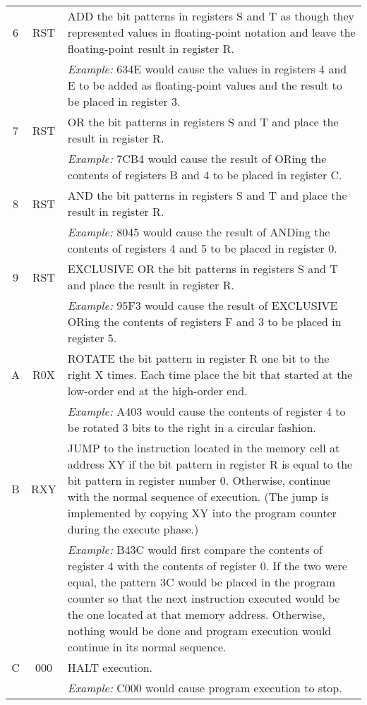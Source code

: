 \begin{longtable}{|c|c|p{10cm}|}
\hline
6 & RST & ADD the bit patterns in registers S and T as though they represented values in floating-point notation and leave the floating-point result in register R. \\
  &     & \textit{Example:} 634E would cause the values in registers 4 and E to be added as floating-point values and the result to be placed in register 3. \\
\hline
7 & RST & OR the bit patterns in registers S and T and place the result in register R. \\
  &     & \textit{Example:} 7CB4 would cause the result of ORing the contents of registers B and 4 to be placed in register C. \\
\hline
8 & RST & AND the bit patterns in registers S and T and place the result in register R. \\
  &     & \textit{Example:} 8045 would cause the result of ANDing the contents of registers 4 and 5 to be placed in register 0. \\
\hline
9 & RST & EXCLUSIVE OR the bit patterns in registers S and T and place the result in register R. \\
  &     & \textit{Example:} 95F3 would cause the result of EXCLUSIVE ORing the contents of registers F and 3 to be placed in register 5. \\
\hline
A & R0X & ROTATE the bit pattern in register R one bit to the right X times. Each time place the bit that started at the low-order end at the high-order end. \\
  &     & \textit{Example:} A403 would cause the contents of register 4 to be rotated 3 bits to the right in a circular fashion. \\
\hline
B & RXY & JUMP to the instruction located in the memory cell at address XY if the bit pattern in register R is equal to the bit pattern in register number 0. Otherwise, continue with the normal sequence of execution. (The jump is implemented by copying XY into the program counter during the execute phase.) \\
  &     & \textit{Example:} B43C would first compare the contents of register 4 with the contents of register 0. If the two were equal, the pattern 3C would be placed in the program counter so that the next instruction executed would be the one located at that memory address. Otherwise, nothing would be done and program execution would continue in its normal sequence. \\
\hline
C & 000 & HALT execution. \\
  &     & \textit{Example:} C000 would cause program execution to stop. \\
\hline
\end{longtable}

